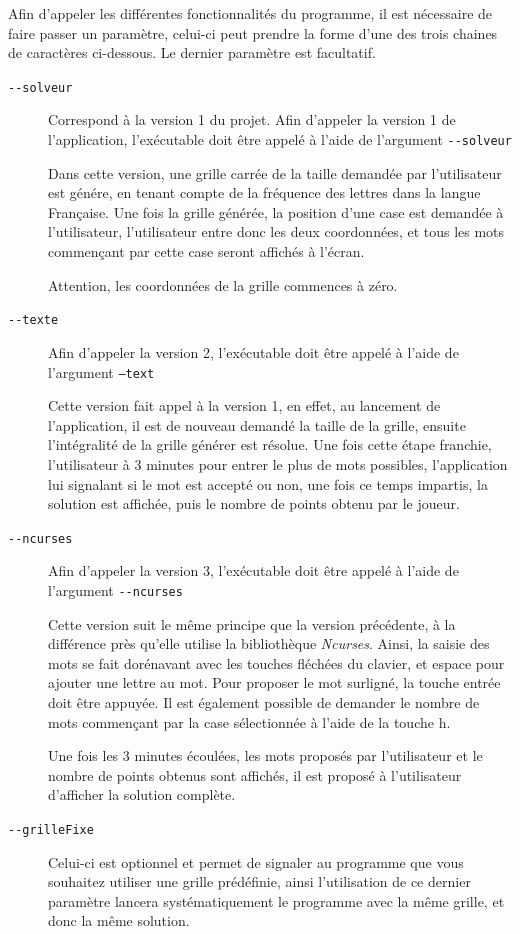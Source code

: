\documentclass[12pt,a4paper,openany]{book}
\begin{document}
			Afin d'appeler les différentes fonctionnalités du programme, il
			est nécessaire de faire passer un paramètre, celui-ci peut prendre la forme d'une
			des trois chaines de caractères ci-dessous. Le dernier paramètre est facultatif.
			\begin{description}
				\item[\texttt{-$ $-solveur}] Correspond à la version 1 du projet.
Afin d'appeler la version 1 de l'application, l'exécutable doit être appelé à l'aide de
l'argument \texttt{-$ $-solveur}

Dans cette version, une grille carrée de la taille demandée par l'utilisateur est génére, en
tenant compte de la fréquence des lettres dans la langue Française. Une fois la grille
générée, la position d'une case est demandée à l'utilisateur, l'utilisateur entre donc les
deux coordonnées, et tous les mots commençant par cette case seront affichés à l'écran.

Attention, les coordonnées de la grille commences à zéro.
				\item[\texttt{-$ $-texte}]
					Afin d'appeler la version 2, l'exécutable doit être appelé à l'aide de
					l'argument \texttt{--text}

					Cette version fait appel à la version 1, en effet, au lancement de
					l'application, il est de nouveau demandé la taille de la grille, ensuite
					l'intégralité de la grille générer est résolue. Une fois cette étape
					franchie, l'utilisateur à 3 minutes pour entrer le plus de mots possibles,
					l'application lui signalant si le mot est accepté ou non, une fois ce
					temps impartis, la solution est affichée, puis le nombre de points obtenu
					par le joueur.
				\item[\texttt{-$ $-ncurses}]
					Afin d'appeler la version 3, l'exécutable doit être appelé à l'aide de
					l'argument \texttt{-$ $-ncurses}

					Cette version suit le même principe que la version précédente, à la
					différence près qu'elle utilise la bibliothèque \textit{Ncurses}. Ainsi, la saisie
					des mots se fait dorénavant avec les touches fléchées du clavier, et
					espace pour ajouter une lettre au mot. Pour proposer le mot surligné, la
					touche entrée doit être appuyée. Il est également possible de demander le
					nombre de mots commençant par la case sélectionnée à l'aide de la touche
					h.

					Une fois les 3 minutes écoulées, les mots proposés par l'utilisateur et le
					nombre de points obtenus sont affichés, il est proposé à l'utilisateur
					d'afficher la solution complète. 
				\item[\texttt{-$ $-grilleFixe}] Celui-ci  est optionnel et permet de signaler au programme que vous souhaitez utiliser
			une grille prédéfinie, ainsi l'utilisation de ce dernier paramètre lancera systématiquement le programme avec la même
			grille, et donc la même solution.
			\end{description}
\end{document}
